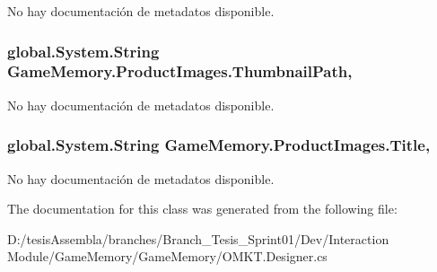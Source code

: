 No hay documentación de metadatos disponible. 

\hypertarget{class_game_memory_1_1_product_images_a75804dbec1120967e319c7b68fa871c5}{
\subsubsection[{Thumbnail\-Path}]{\setlength{\rightskip}{0pt plus 5cm}global.\-System.\-String Game\-Memory.\-Product\-Images.\-Thumbnail\-Path\hspace{0.3cm}{\ttfamily [get]}, {\ttfamily [set]}}}\label{class_game_memory_1_1_product_images_a75804dbec1120967e319c7b68fa871c5}


No hay documentación de metadatos disponible. 

\hypertarget{class_game_memory_1_1_product_images_a36f676489d4534cca829e8ee91b09619}{
\subsubsection[{Title}]{\setlength{\rightskip}{0pt plus 5cm}global.\-System.\-String Game\-Memory.\-Product\-Images.\-Title\hspace{0.3cm}{\ttfamily [get]}, {\ttfamily [set]}}}\label{class_game_memory_1_1_product_images_a36f676489d4534cca829e8ee91b09619}


No hay documentación de metadatos disponible. 



The documentation for this class was generated from the following file\-:\begin{DoxyCompactItemize}
\item 
D\-:/tesis\-Assembla/branches/\-Branch\-\_\-\-Tesis\-\_\-\-Sprint01/\-Dev/\-Interaction Module/\-Game\-Memory/\-Game\-Memory/O\-M\-K\-T.\-Designer.\-cs\end{DoxyCompactItemize}
